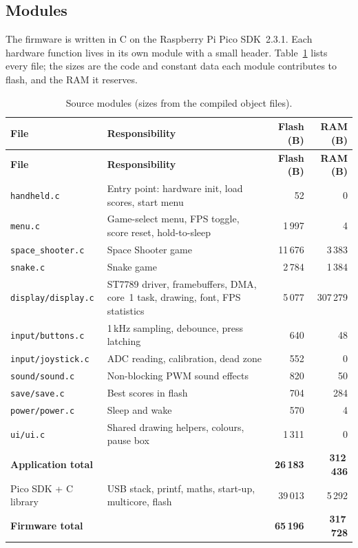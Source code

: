 \documentclass[11pt,a4paper]{article}
\newcommand{\file}[1]{\texttt{#1}}
\begin{document}
\subsection{Modules}
The firmware is written in C on the Raspberry Pi Pico SDK~2.3.1. Each hardware
function lives in its own module with a small header. Table~\ref{tab:modules}
lists every file; the sizes are the code and constant data each module
contributes to flash, and the RAM it reserves.

\small\begin{longtable}{p{3.3cm}p{7.3cm}rr}
\caption{Source modules (sizes from the compiled object files).}\label{tab:modules}\\
\toprule
\textbf{File} & \textbf{Responsibility} & \textbf{Flash (B)} & \textbf{RAM (B)} \\
\midrule\endfirsthead
\toprule
\textbf{File} & \textbf{Responsibility} & \textbf{Flash (B)} & \textbf{RAM (B)} \\
\midrule\endhead
\file{handheld.c} & Entry point: hardware init, load scores, start menu & 52 & 0 \\
\file{menu.c} & Game-select menu, FPS toggle, score reset, hold-to-sleep & 1\,997 & 4 \\
\file{space\_shooter.c} & Space Shooter game & 11\,676 & 3\,383 \\
\file{snake.c} & Snake game & 2\,784 & 1\,384 \\
\file{display/}\allowbreak\file{display.c} & ST7789 driver, framebuffers, DMA, core~1 task, drawing, font, FPS statistics & 5\,077 & 307\,279 \\
\file{input/buttons.c} & 1\,kHz sampling, debounce, press latching & 640 & 48 \\
\file{input/joystick.c} & ADC reading, calibration, dead zone & 552 & 0 \\
\file{sound/sound.c} & Non-blocking PWM sound effects & 820 & 50 \\
\file{save/save.c} & Best scores in flash & 704 & 284 \\
\file{power/power.c} & Sleep and wake & 570 & 4 \\
\file{ui/ui.c} & Shared drawing helpers, colours, pause box & 1\,311 & 0 \\
\midrule
\textbf{Application total} & & \textbf{26\,183} & \textbf{312\,436} \\
Pico SDK + C library & USB stack, printf, maths, start-up, multicore, flash & 39\,013 & 5\,292 \\
\midrule
\textbf{Firmware total} & & \textbf{65\,196} & \textbf{317\,728} \\
\bottomrule
\end{longtable}\normalsize
\end{document}
